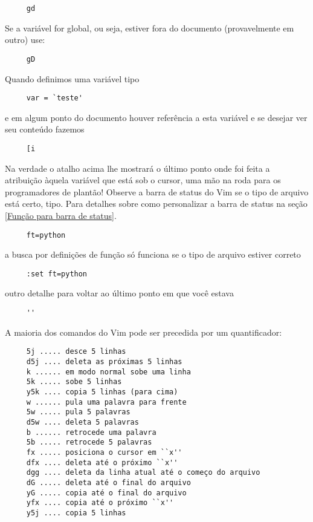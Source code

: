 \begin{verbatim}
     gd
\end{verbatim}

Se a variável for global, ou seja, estiver fora do documento
(provavelmente em outro) use:

\begin{verbatim}
     gD
\end{verbatim}

Quando definimos uma variável tipo

\begin{verbatim}
     var = `teste'
\end{verbatim}

e em algum ponto do documento houver referência a esta variável e se
desejar ver seu conteúdo fazemos

\begin{verbatim}
     [i
\end{verbatim}

Na verdade o atalho acima lhe mostrará o último ponto onde foi feita a
atribuição àquela variável que está sob o cursor, uma mão na roda para os
programadores de plantão!  {\Large {}} Observe a  barra de status do
Vim se o tipo de arquivo está certo, tipo. Para detalhes sobre como
personalizar a barra de status na seção \ref{Função para barra de status}.

\begin{verbatim}
     ft=python
\end{verbatim}

a busca por definições de função só funciona se o tipo de arquivo
estiver correto

\begin{verbatim}
     :set ft=python
\end{verbatim}

outro detalhe para voltar ao último ponto em que você estava

\begin{verbatim}
     ''
\end{verbatim}

A maioria dos comandos do Vim pode ser precedida por um quantificador:

\begin{verbatim}
     5j ..... desce 5 linhas
     d5j .... deleta as próximas 5 linhas
     k ...... em modo normal sobe uma linha
     5k ..... sobe 5 linhas
     y5k .... copia 5 linhas (para cima)
     w ...... pula uma palavra para frente
     5w ..... pula 5 palavras
     d5w .... deleta 5 palavras
     b ...... retrocede uma palavra
     5b ..... retrocede 5 palavras
     fx ..... posiciona o cursor em ``x''
     dfx .... deleta até o próximo ``x''
     dgg .... deleta da linha atual até o começo do arquivo
     dG ..... deleta até o final do arquivo
     yG ..... copia até o final do arquivo
     yfx .... copia até o próximo ``x''
     y5j .... copia 5 linhas
\end{verbatim}

